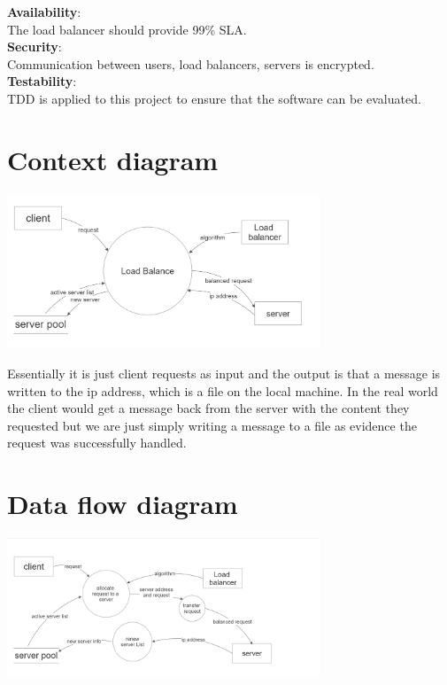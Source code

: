 \documentclass{article}
\begin{document}
\noindent\textbf{Availability}: \\
The load balancer should provide 99\% SLA. \\

\noindent\textbf{Security}: \\
Communication between users, load balancers, servers is encrypted. \\

\noindent\textbf{Testability}: \\
TDD is applied to this project to ensure that the software can be evaluated.
\section{Context diagram}
\includegraphics[width=0.7\textwidth,center]{0-level data flow diagram.png}

Essentially it is just client requests as input and the output is that a message is written to the ip address, which is a file on the local machine. In the real world the client would get a message back from the server with the content they requested but we are just simply writing a message to a file as evidence the request was successfully handled. 

\section{Data flow diagram}
\includegraphics[width=0.7\textwidth,center]{1-level data flow diagram.png}
\end{document}

